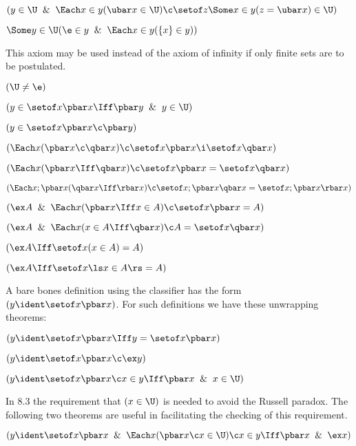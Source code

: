  $(y \in \U \And \Each x \in y (\ubar x \in \U)
\c \setof z \Some x \in y(z = \ubar x) \in \U)$
\lineb


 $\Some y \in \U (\e \in y \And \Each x \in y(\{x\} \in y))$
\lineb


This axiom may be used instead of the axiom of infinity if 
only finite sets are to be postulated. 

 $(\U \ne \e)$
\lineb


 $(y \in \setof x \pbar x \Iff \pbar y \And y \in \U)$

 $(y \in \setof x \pbar x \c \pbar y)$

 $(\Each x( \pbar x \c \qbar x) \c \setof x \pbar x \i \setof x \qbar x)$

 $(\Each x( \pbar x \Iff \qbar x) \c \setof x \pbar x = \setof x \qbar x)$

 $(\Each x;\pbar x( \qbar x \Iff \rbar x) \c \setof x;\pbar x\qbar x = \setof x ;\pbar x \rbar x)$

 $(\ex A \And \Each x (\pbar x \Iff  x \in A) \c \setof x \pbar x = A)$

 $(\ex A \And \Each x (x\in A \Iff \qbar x) \c  A = \setof x \qbar x)$

 $(\ex A \Iff \setof x (x \in A) = A)$

 $(\ex A \Iff \setof x \ls x \in A \rs = A)$
\lineb
\lineb


A bare bones definition using the classifier has the form $(y \ident \setof x \pbar x)$.
For such definitions we have these unwrapping theorems:
\lineb

 $(y \ident \setof x \pbar x \Iff y = \setof x \pbar x)$

 $(y \ident \setof x \pbar x \c \ex y)$

 $(y \ident \setof x \pbar x \c x \in y \Iff \pbar x \And x \in \U)$
	\lineb

In 8.3 the requirement that $(x \in \U)$ is needed to avoid the Russell
paradox.  The following two theorems are useful in facilitating the
checking of this requirement.     
	\lineb

 $(y \ident \setof x \pbar x \And \Each x(\pbar x \c x \in \U)
	\c x \in y \Iff \pbar x \And \ex x)$

